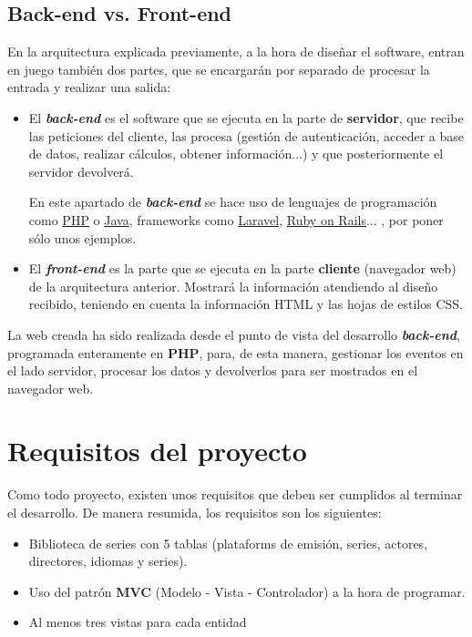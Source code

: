 \documentclass{\ClassPath/viu-tfm-template}
\begin{document}
\section{Back-end vs. Front-end}
En la arquitectura explicada previamente, a la hora de diseñar el software, entran en juego también dos partes, que se encargarán por separado de procesar la entrada y realizar una salida:

\vspace{-1em}
\begin{itemize}
    \item El \textbf{\textit{back-end}} es el software que se ejecuta en la parte de \textbf{servidor}, que recibe las peticiones del cliente, las procesa (gestión de autenticación, acceder a base de datos, realizar cálculos, obtener información...) y que posteriormente el servidor devolverá.

    En este apartado de \textbf{\textit{back-end}} se hace uso de lenguajes de programación como \href{https://www.php.net/}{PHP} o \href{https://www.java.com/es/}{Java}, frameworks como \href{https://laravel.com/}{Laravel}, \href{https://rubyonrails.org/}{Ruby on Rails}... , por poner sólo unos ejemplos.

    \item El \textbf{\textit{front-end}} es la parte que se ejecuta en la parte \textbf{cliente} (navegador web) de la arquitectura anterior. Mostrará la información atendiendo al diseño recibido, teniendo en cuenta la información HTML y las hojas de estilos CSS.
\end{itemize}
\vspace{-1em}

La web creada ha sido realizada desde el punto de vista del desarrollo \textbf{\textit{back-end}}, programada enteramente en \textbf{PHP}, para, de esta manera, gestionar los eventos en el lado servidor, procesar los datos y devolverlos para ser mostrados en el navegador web.


\chapter{Requisitos del proyecto}

Como todo proyecto, existen unos requisitos que deben ser cumplidos al terminar el desarrollo. De manera resumida, los requisitos son los siguientes:

\vspace{-1em}
\begin{itemize}
    \item Biblioteca de series con 5 tablas (plataforms de emisión, series, actores, directores, idiomas y series).
    \item Uso del patrón \textbf{MVC} (Modelo - Vista - Controlador) a la hora     de programar.
    \item Al menos tres vistas para cada entidad
\end{itemize}
\vspace{-1em}
\end{document}

